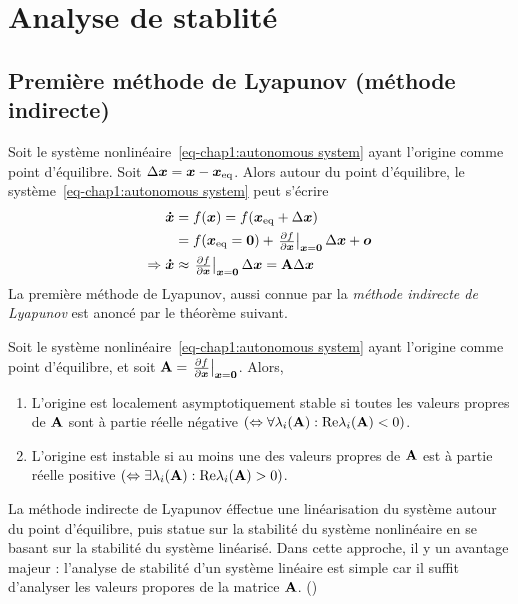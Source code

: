 \section{Analyse de stablité}\label{sec:stability analysis}
\subsection{Première méthode de Lyapunov (méthode indirecte)}
Soit le système nonlinéaire~\eqref{eq-chap1:autonomous system} ayant l'origine comme point d'équilibre. Soit $\Delta \bm{x} = \bm{x}-\bm{x}_{\rm eq}$. Alors autour du point d'équilibre, le système~\eqref{eq-chap1:autonomous system} peut s'écrire
\begin{align}
\begin{split}
\bm{\dot{x}} &= f(\bm{x}) = f(\bm{x}_{\rm eq}+\Delta\bm{x})\\
&=f(\bm{x}_{\rm eq}=\mathbf{0}) + \left.\begin{matrix}
\frac{\partial f}{\partial\bm{x}}
\end{matrix}\right|_{{\bm{x} = \mathbf{0}}}\Delta\bm{x} + \bm{o} \\
\Rightarrow\bm{\dot{x}}&\approx\left.\begin{matrix}
\frac{\partial f}{\partial\bm{x}}
\end{matrix}\right|_{{\bm{x} = \mathbf{0}}}\Delta\bm{x} = \mathbf{A}\Delta\bm{x} 
\end{split}
\end{align} 
La première méthode de Lyapunov, aussi connue par la \emph{méthode indirecte de Lyapunov} est anoncé par le théorème suivant.
\begin{theoreme}\label{thm:indirect Lyapunov method}
	Soit le système nonlinéaire~\eqref{eq-chap1:autonomous system} ayant l'origine comme point d'équilibre, et soit $\mathbf{A} =\left.\begin{matrix}
	\frac{\partial f}{\partial\bm{x}}
	\end{matrix}\right|_{{\bm{x} = \mathbf{0}}}$. Alors,
	\begin{enumerate}
		\item L'origine est localement asymptotiquement stable si toutes les valeurs propres de $\mathbf{A}$ sont à partie réelle négative $\left(\Leftrightarrow \forall\lambda_i(\mathbf{A}): {\rm Re}\lambda_i(\mathbf{A})<0\right)$.
		\item L'origine est instable si au moins une des valeurs propres de $\mathbf{A}$ est à partie réelle positive $\left(\Leftrightarrow \exists\lambda_i(\mathbf{A}): {\rm Re}\lambda_i(\mathbf{A})>0\right)$.
	\end{enumerate}
\end{theoreme}
La méthode indirecte de Lyapunov éffectue une  linéarisation du système autour du point d'équilibre, puis statue sur la stabilité du système nonlinéaire en se basant sur la stabilité du système linéarisé. Dans cette approche, il y un avantage majeur : l'analyse de stabilité d'un système linéaire est simple car il suffit d'analyser les valeurs propores de la matrice $\mathbf{A}$. ()

